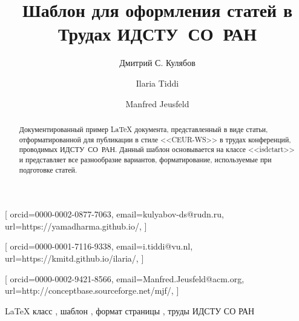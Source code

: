 \documentclass[
12pt,
polyglossia,   %
firacode,    %
wordmath,      %
russian        %
]{isdctart}
\begin{document}
\startrussian

 


\title{Шаблон для оформления статей в Трудах ИДСТУ~СО~РАН}

\author[1,2]{Дмитрий С. Кулябов}[%
orcid=0000-0002-0877-7063,
email=kulyabov-ds@rudn.ru,
url=https://yamadharma.github.io/,
]
\address[1]{Peoples' Friendship University of Russia (RUDN University),
  6 Miklukho-Maklaya St, Moscow, 117198, Russian Federation}
\address[2]{Joint Institute for Nuclear Research,
  6 Joliot-Curie, Dubna, Moscow region, 141980, Russian Federation}

\author[3]{Ilaria Tiddi}[%
orcid=0000-0001-7116-9338,
email=i.tiddi@vu.nl,
url=https://kmitd.github.io/ilaria/,
]
\address[3]{Vrije Universiteit Amsterdam, De Boelelaan 1105, 1081 HV Amsterdam, The Netherlands}

\author[4]{Manfred Jeusfeld}[%
orcid=0000-0002-9421-8566,
email=Manfred.Jeusfeld@acm.org,
url=http://conceptbase.sourceforge.net/mjf/,
]
\address[4]{University of Skövde, Högskolevägen 1, 541 28 Skövde, Sweden}

\begin{abstract}
  Документированный пример \LaTeX{} документа, представленный в виде статьи, отформатированной для публикации в стиле <<CEUR-WS>> в трудах конференций, проводимых ИДСТУ~СО~РАН. Данный шаблон основывается на классе <<isdctart>> и представляет все разнообразие вариантов, форматирование, используемые при подготовке статей.
\end{abstract}

\begin{keywords}
  LaTeX класс \sep   %
  шаблон \sep
  формат страницы \sep
  труды ИДСТУ СО РАН
\end{keywords}
\end{document}
